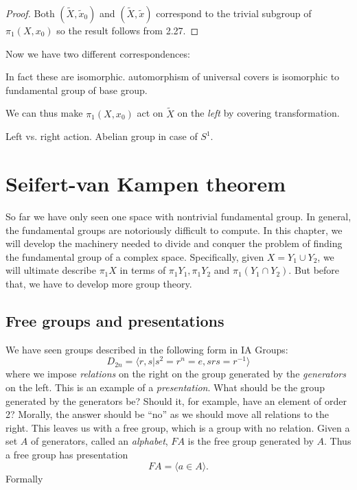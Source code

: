 \documentclass[a4paper]{article}
\begin{document}
\begin{proof}
  Both \((\tilde X, \tilde x_0)\) and \((\tilde X, \tilde x)\) correspond to the trivial subgroup of \(\pi_1(X, x_0)\) so the result follows from 2.27.
\end{proof}

Now we have two different correspondences:

\blindtext

In fact these are isomorphic. automorphism of universal covers is isomorphic to fundamental group of base group.

We can thus make \(\pi_1(X, x_0)\) act on \(\tilde X\) on the \emph{left} by covering transformation.
\begin{remark}
  Left vs. right action. Abelian group in case of \(S^1\).
\end{remark}

\section{Seifert-van Kampen theorem}

So far we have only seen one space with nontrivial fundamental group. In general, the fundamental groups are notoriously difficult to compute. In this chapter, we will develop the machinery needed to divide and conquer the problem of finding the fundamental group of a complex space. Specifically, given \(X = Y_1 \cup Y_2\), we will ultimate describe \(\pi_1X\) in terms of \(\pi_1Y_1, \pi_1Y_2\) and \(\pi_1(Y_1 \cap Y_2)\). But before that, we have to develop more group theory.

\subsection{Free groups and presentations}

We have seen groups described in the following form in IA Groups:
\[
  D_{2n} = \langle r, s | s^2 = r^n = e, srs = r^{-1} \rangle
\]
where we impose \emph{relations} on the right on the group generated by the \emph{generators} on the left. This is an example of a \emph{presentation}. What should be the group generated by the generators be? Should it, for example, have an element of order 2? Morally, the answer should be ``no'' as we should move all relations to the right. This leaves us with a free group, which is a group with no relation. Given a set \(A\) of generators, called an \emph{alphabet}, \(FA\) is the free group generated by \(A\). Thus a free group has presentation
\[
  FA = \langle a \in A \rangle.
\]
Formally
\end{document}
